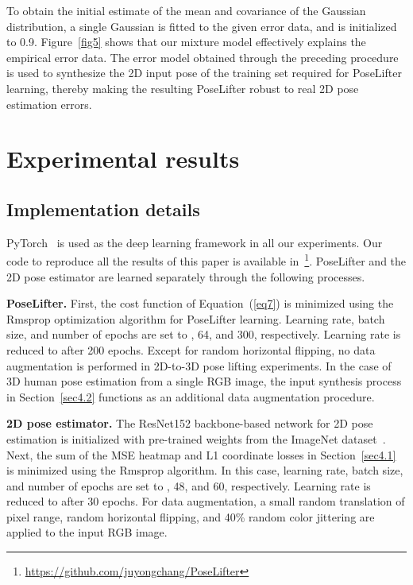\documentclass[10pt,twocolumn,letterpaper]{article}
\begin{document}
To obtain the initial estimate of the mean and covariance of the Gaussian distribution, a single Gaussian is fitted to the given error data, and  is initialized to 0.9. Figure~\ref{fig5} shows that our mixture model effectively explains the empirical error data. The error model obtained through the preceding procedure is used to synthesize the 2D input pose of the training set required for PoseLifter learning, thereby making the resulting PoseLifter robust to real 2D pose estimation errors.


\section{Experimental results}
\label{sec5}

\subsection{Implementation details}
\label{sec5.1}

PyTorch~\cite{Paszke2017} is used as the deep learning framework in all our experiments. Our code to reproduce all the results of this paper is available in~\footnote{\url{https://github.com/juyongchang/PoseLifter}}. PoseLifter and the 2D pose estimator are learned separately through the following processes.

\textbf{PoseLifter.} First, the cost function of Equation~(\ref{eq7}) is minimized using the Rmsprop optimization algorithm \cite{Tieleman2012} for PoseLifter learning. Learning rate, batch size, and number of epochs are set to , 64, and 300, respectively. Learning rate is reduced to  after 200 epochs. Except for random horizontal flipping, no data augmentation is performed in 2D-to-3D pose lifting experiments. In the case of 3D human pose estimation from a single RGB image, the input synthesis process in Section~\ref{sec4.2} functions as an additional data augmentation procedure.

\textbf{2D pose estimator.} The ResNet152 backbone-based network for 2D pose estimation is initialized with pre-trained weights from the ImageNet dataset~\cite{Russakovsky2015}. Next, the sum of the MSE heatmap and L1 coordinate losses in Section~\ref{sec4.1} is minimized using the Rmsprop algorithm. In this case, learning rate, batch size, and number of epochs are set to , 48, and 60, respectively. Learning rate is reduced to  after 30 epochs. For data augmentation, a small random translation of  pixel range, random horizontal flipping, and 40\% random color jittering are applied to the input RGB image.
\end{document}
